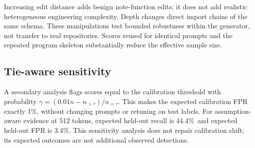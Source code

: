 \documentclass[10pt,letterpaper]{article}
\begin{document}
Increasing edit distance adds benign note-function edits; it does not add realistic heterogeneous engineering complexity. Depth changes direct import chains of the same schema. These manipulations test bounded robustness within the generator, not transfer to real repositories. Scores reused for identical prompts and the repeated program skeleton substantially reduce the effective sample size.

\subsection*{Tie-aware sensitivity}
A secondary analysis flags scores equal to the calibration threshold with probability $\gamma=(0.01n-n_{>\tau})/n_{=\tau}$. This makes the expected calibration FPR exactly 1\%, without changing prompts or retuning on test labels. For assumption-aware evidence at 512 tokens, expected held-out recall is 44.4\%\ and expected held-out FPR is 3.4\%. This sensitivity analysis does not repair calibration shift; its expected outcomes are not additional observed detections.

\clearpage
\end{document}
